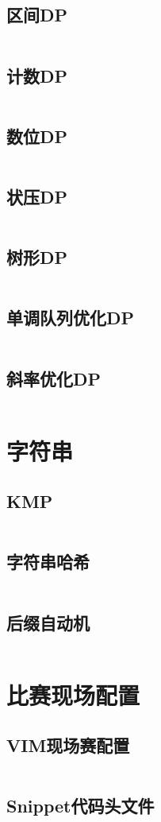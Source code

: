 \documentclass[a4paper,12pt]{article}
\begin{document}
\subsection{区间DP}
\inputminted[breaklines]{c++}{dp/interval.cc}
\subsection{计数DP}
\inputminted[breaklines]{c++}{dp/jishu.cc}
\subsection{数位DP}
\inputminted[breaklines]{c++}{dp/shuwei.cc}
\subsection{状压DP}
\inputminted[breaklines]{c++}{dp/zhuangya.cc}
\subsection{树形DP}
\inputminted[breaklines]{c++}{dp/treedp.cc}
\subsection{单调队列优化DP}
\inputminted[breaklines]{c++}{dp/dddl.cc}
\subsection{斜率优化DP}
\inputminted[breaklines]{c++}{dp/xielv.cc}


\newpage
\section{字符串}
\subsection{KMP}
\inputminted[breaklines]{c++}{string/kmp.cc}
\subsection{字符串哈希}
\inputminted[breaklines]{c++}{string/hash.cc}
\subsection{后缀自动机}
\inputminted[breaklines]{c++}{string/suffix-automaton.cc}


\newpage
\section{比赛现场配置}
\subsection{VIM现场赛配置}
\inputminted[breaklines]{bash}{others/vim.bash}
\subsection{Snippet代码头文件}
\inputminted[breaklines]{c++}{others/head.cc}
\end{document}
